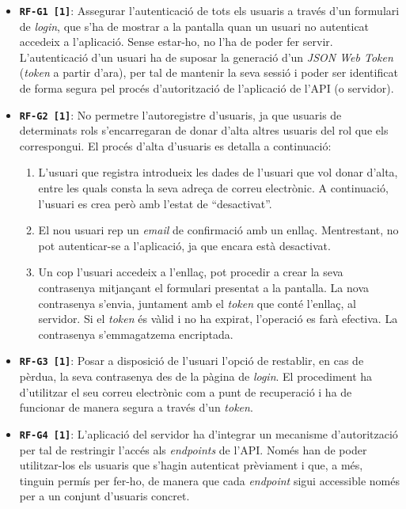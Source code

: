 \documentclass[a4paper,12pt]{ThesisStyle}
\begin{document}
\begin{itemize}
  \item \texttt{\textbf{RF-G1 [1]}}: Assegurar l'autenticació de tots els usuaris a través d'un formulari de \textit{login}, que s'ha de mostrar a la pantalla quan un usuari no autenticat accedeix a l'aplicació. Sense estar-ho, no l'ha de poder fer servir. L'autenticació d'un usuari ha de suposar la generació d'un \textit{JSON Web Token}~\cite{JWT} (\textit{token} a partir d'ara), per tal de mantenir la seva sessió i poder ser identificat de forma segura pel procés d'autorització de l'aplicació de l'API (o servidor).
  \item \texttt{\textbf{RF-G2 [1]}}: No permetre l'autoregistre d'usuaris, ja que usuaris de determinats rols s'encarregaran de donar d'alta altres usuaris del rol que els correspongui. El procés d'alta d'usuaris es detalla a continuació:
        \begin{enumerate}
          \item L'usuari que registra introdueix les dades de l'usuari que vol donar d'alta, entre les quals consta la seva adreça de correu electrònic. A continuació, l'usuari es crea però amb l'estat de ``desactivat''.
          \item El nou usuari rep un \textit{email} de confirmació amb un enllaç. Mentrestant, no pot autenticar-se a l'aplicació, ja que encara està desactivat.
          \item Un cop l'usuari accedeix a l'enllaç, pot procedir a crear la seva contrasenya mitjançant el formulari presentat a la pantalla. La nova contrasenya s'envia, juntament amb el \textit{token} que conté l'enllaç, al servidor. Si el \textit{token} és vàlid i no ha expirat, l'operació es farà efectiva. La contrasenya s'emmagatzema encriptada.
        \end{enumerate}
  \item \texttt{\textbf{RF-G3 [1]}}: Posar a disposició de l'usuari l'opció de restablir, en cas de pèrdua, la seva contrasenya des de la pàgina de \textit{login}. El procediment ha d'utilitzar el seu correu electrònic com a punt de recuperació i ha de funcionar de manera segura a través d'un \textit{token}.
  \item \texttt{\textbf{RF-G4 [1]}}: L'aplicació del servidor ha d'integrar un mecanisme d'autorització per tal de restringir l'accés als \textit{endpoints} de l'API. Només han de poder utilitzar-los els usuaris que s'hagin autenticat prèviament i que, a més, tinguin permís per fer-ho, de manera que cada \textit{endpoint} sigui accessible només per a un conjunt d'usuaris concret.

\end{itemize}
\end{document}
